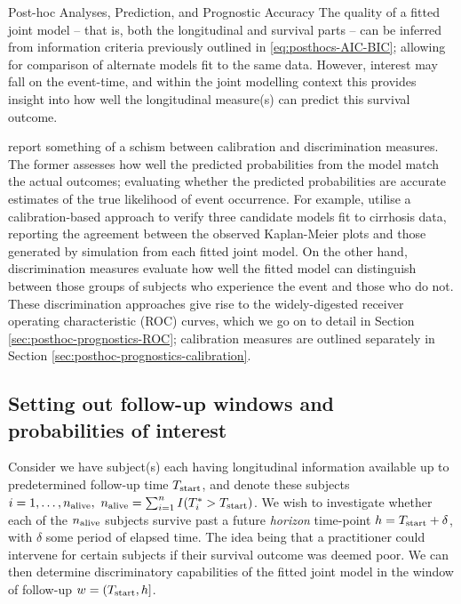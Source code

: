 \begin{chapter}{\label{cha:posthoc}Post-hoc Analyses, Prediction, and Prognostic Accuracy}
The quality of a fitted joint model -- that is, both the longitudinal and survival parts -- can be inferred from information criteria previously outlined in \eqref{eq:posthocs-AIC-BIC}; allowing for comparison of alternate models fit to the same data. However, interest may fall on the event-time, and within the joint modelling context this provides insight into how well the longitudinal measure(s) can predict this survival outcome. 

\citet{RizopoulosJMbook} report something of a schism between calibration and discrimination measures. The former assesses how well the predicted probabilities from the model match the actual outcomes; \ie evaluating whether the predicted probabilities are accurate estimates of the true likelihood of event occurrence. For example, \citet{Henderson2002} utilise a calibration-based approach to verify three candidate models fit to cirrhosis data, reporting the agreement between the observed Kaplan-Meier plots and those generated by simulation from each fitted joint model. On the other hand, discrimination measures evaluate how well the fitted model can distinguish between those groups of subjects who experience the event and those who do not. These discrimination approaches give rise to \eg the widely-digested receiver operating characteristic (ROC) curves, which we go on to detail in Section \ref{sec:posthoc-prognostics-ROC}; calibration measures are outlined separately in Section \ref{sec:posthoc-prognostics-calibration}.

\subsection{Setting out follow-up windows and probabilities of interest}\label{sec:posthoc-prognostics-setup}
Consider we have subject(s) each having longitudinal information available up to predetermined follow-up time $T_{\mathrm{start}}$, and denote these subjects $i=1,\dots,n_{\mathrm{alive}},\ n_{\mathrm{alive}}=\sum_{i=1}^n I\!\left( T_i^*>T_{\mathrm{start}}\right)$. We wish to investigate whether each of the $n_{\mathrm{alive}}$ subjects survive past a future \textit{horizon} time-point $h=T_{\mathrm{start}}+\delta$, with $\delta$ some period of elapsed time. The idea being that a practitioner could intervene for certain subjects if their survival outcome was deemed poor. We can then determine discriminatory capabilities of the fitted joint model in the window of follow-up $w=(T_{\mathrm{start}},h]$. 


\end{chapter}
